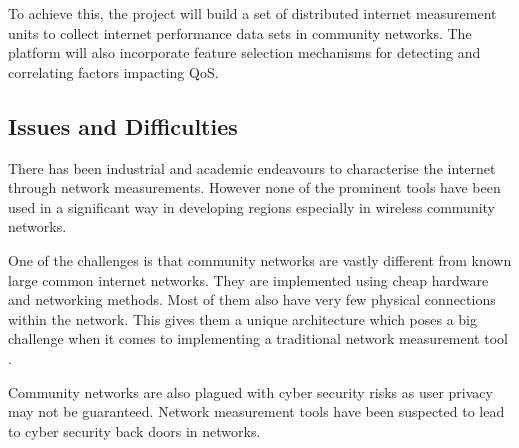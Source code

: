 To achieve this, the project will build a set of distributed internet measurement units to collect internet performance data sets in community networks. The platform will also incorporate feature selection mechanisms for detecting and correlating factors impacting QoS.

\subsection{Issues and Difficulties}
There has been industrial and academic endeavours to characterise the internet through network measurements. However none of the prominent tools have been used in a significant way in developing regions especially in wireless community networks.

One of the challenges is that community networks are vastly different from known large common internet networks. They are implemented using cheap hardware and networking methods. Most of them also have very few physical connections within the network. This gives them a unique architecture which poses a big challenge when it comes to implementing a traditional network measurement tool \cite{Braem:2013:CRC:2500098.2500108}.

Community networks are also plagued with cyber security risks as user privacy may not be guaranteed. Network measurement tools have been suspected to lead to cyber security back doors in networks. 


